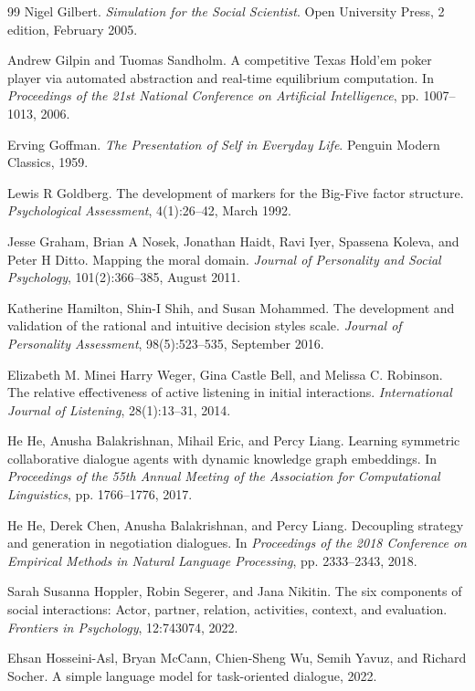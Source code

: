 \documentclass[11pt,a4paper]{article}
\begin{document}
\begin{thebibliography}{99}
Nigel Gilbert. \textit{Simulation for the Social Scientist}. Open University Press, 2 edition, February 2005.

Andrew Gilpin and Tuomas Sandholm. A competitive Texas Hold'em poker player via automated abstraction and real-time equilibrium computation. In \textit{Proceedings of the 21st National Conference on Artificial Intelligence}, pp. 1007--1013, 2006.

Erving Goffman. \textit{The Presentation of Self in Everyday Life}. Penguin Modern Classics, 1959.

Lewis R Goldberg. The development of markers for the Big-Five factor structure. \textit{Psychological Assessment}, 4(1):26--42, March 1992.

Jesse Graham, Brian A Nosek, Jonathan Haidt, Ravi Iyer, Spassena Koleva, and Peter H Ditto. Mapping the moral domain. \textit{Journal of Personality and Social Psychology}, 101(2):366--385, August 2011.

Katherine Hamilton, Shin-I Shih, and Susan Mohammed. The development and validation of the rational and intuitive decision styles scale. \textit{Journal of Personality Assessment}, 98(5):523--535, September 2016.

Elizabeth M. Minei Harry Weger, Gina Castle Bell, and Melissa C. Robinson. The relative effectiveness of active listening in initial interactions. \textit{International Journal of Listening}, 28(1):13--31, 2014.

He He, Anusha Balakrishnan, Mihail Eric, and Percy Liang. Learning symmetric collaborative dialogue agents with dynamic knowledge graph embeddings. In \textit{Proceedings of the 55th Annual Meeting of the Association for Computational Linguistics}, pp. 1766--1776, 2017.

He He, Derek Chen, Anusha Balakrishnan, and Percy Liang. Decoupling strategy and generation in negotiation dialogues. In \textit{Proceedings of the 2018 Conference on Empirical Methods in Natural Language Processing}, pp. 2333--2343, 2018.

Sarah Susanna Hoppler, Robin Segerer, and Jana Nikitin. The six components of social interactions: Actor, partner, relation, activities, context, and evaluation. \textit{Frontiers in Psychology}, 12:743074, 2022.

Ehsan Hosseini-Asl, Bryan McCann, Chien-Sheng Wu, Semih Yavuz, and Richard Socher. A simple language model for task-oriented dialogue, 2022.


\end{thebibliography}
\end{document}
